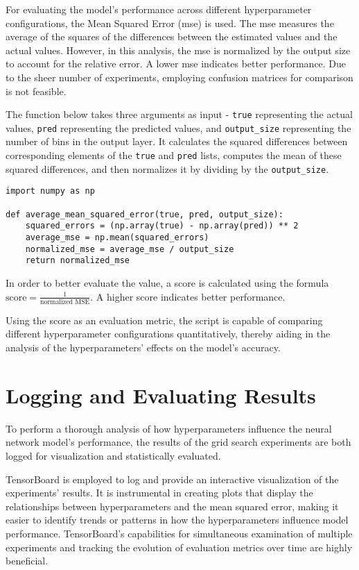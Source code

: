 For evaluating the model's performance across different hyperparameter configurations, the Mean Squared Error (\ac{mse}) is used. The \ac{mse} measures the average of the squares of the differences between the estimated values and the actual values. However, in this analysis, the \ac{mse} is normalized by the output size to account for the relative error. A lower \ac{mse} indicates better performance. Due to the sheer number of experiments, employing confusion matrices for comparison is not feasible.

The function below takes three arguments as input - \verb|true| representing the actual values, \verb|pred| representing the predicted values, and \verb|output_size| representing the number of bins in the output layer. It calculates the squared differences between corresponding elements of the \verb|true| and \verb|pred| lists, computes the mean of these squared differences, and then normalizes it by dividing by the \verb|output_size|.

\begin{verbatim}
import numpy as np

def average_mean_squared_error(true, pred, output_size):
    squared_errors = (np.array(true) - np.array(pred)) ** 2
    average_mse = np.mean(squared_errors)
    normalized_mse = average_mse / output_size
    return normalized_mse
\end{verbatim}

In order to better evaluate the value, a score is calculated using the formula $\text{score} = \frac{1}{\text{normalized MSE}}$. A higher score indicates better performance.

Using the score as an evaluation metric, the script is capable of comparing different hyperparameter configurations quantitatively, thereby aiding in the analysis of the hyperparameters' effects on the model's accuracy.


\section{Logging and Evaluating Results}

To perform a thorough analysis of how hyperparameters influence the neural network model's performance, the results of the grid search experiments are both logged for visualization and statistically evaluated.

TensorBoard is employed to log and provide an interactive visualization of the experiments' results. It is instrumental in creating plots that display the relationships between hyperparameters and the mean squared error, making it easier to identify trends or patterns in how the hyperparameters influence model performance. TensorBoard’s capabilities for simultaneous examination of multiple experiments and tracking the evolution of evaluation metrics over time are highly beneficial.


